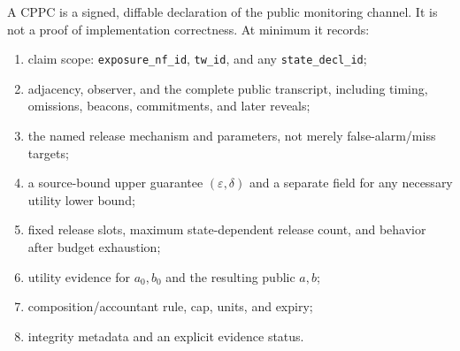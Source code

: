 \documentclass[11pt]{article}
\begin{document}
A CPPC is a signed, diffable declaration of the public monitoring channel.
It is not a proof of implementation correctness.
At minimum it records:
\begin{enumerate}[leftmargin=*]
\item claim scope: \texttt{exposure\_nf\_id}, \texttt{tw\_id}, and any \texttt{state\_decl\_id};
\item adjacency, observer, and the complete public transcript, including timing, omissions, beacons, commitments, and later reveals;
\item the named release mechanism and parameters, not merely false-alarm/miss targets;
\item a source-bound upper guarantee $(\varepsilon,\delta)$ and a separate field for any necessary utility lower bound;
\item fixed release slots, maximum state-dependent release count, and behavior after budget exhaustion;
\item utility evidence for $a_0,b_0$ and the resulting public $a,b$;
\item composition/accountant rule, cap, units, and expiry;
\item integrity metadata and an explicit evidence status.
\end{enumerate}
\end{document}
